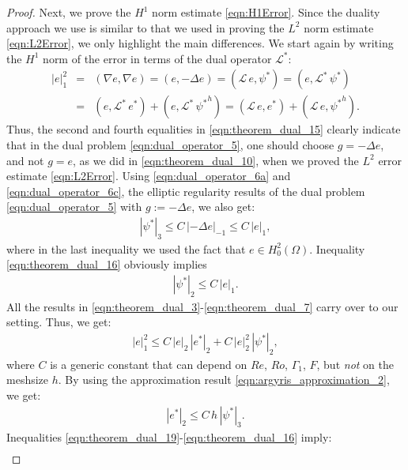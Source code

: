 \begin{proof}
Next, we prove the $H^1$ norm estimate \eqref{eqn:H1Error}.
Since the duality approach we use is similar to that we used in proving the  $L^2$ norm estimate \eqref{eqn:L2Error}, we only highlight the main differences.
We start again by writing the $H^1$ norm of the error in terms of the dual operator $\mathcal{L}^*$:
\begin{eqnarray}
|e|_1^2
&=& (\nabla e , \nabla e)
= ( e , - \Delta e)
= (\mathcal{L} \, e , \psi^*)
= (e , \mathcal{L}^* \, \psi^*)
\nonumber \\
&=& (e , \mathcal{L}^* \, e^*)
+ (e , \mathcal{L}^* \, {\psi^*}^h)
= (\mathcal{L} \, e , e^*)
+ (\mathcal{L} \, e , {\psi^*}^h) .
\label{eqn:theorem_dual_15}
\end{eqnarray}
Thus, the second and fourth equalities in \eqref{eqn:theorem_dual_15} clearly indicate that in the dual problem \eqref{eqn:dual_operator_5}, one should choose $g = - \Delta e$, and not $g = e$, as we did in \eqref{eqn:theorem_dual_10}, when we proved the $L^2$ error estimate \eqref{eqn:L2Error}.
Using \eqref{eqn:dual_operator_6a} and \eqref{eqn:dual_operator_6c}, the elliptic regularity results of the dual problem \eqref{eqn:dual_operator_5} with $g :=  - \Delta e$, we also get:
\begin{eqnarray}
| \psi^* |_3
\leq C \, | - \Delta e |_{-1}
\leq C \, | e |_1 ,
\label{eqn:theorem_dual_16}
\end{eqnarray}
where in the last inequality we used the fact that $e \in H_0^2(\Omega)$.
Inequality \eqref{eqn:theorem_dual_16} obviously implies
\begin{eqnarray}
| \psi^* |_2
\leq C \, | e |_1 .
\label{eqn:theorem_dual_17}
\end{eqnarray}
All the results in \eqref{eqn:theorem_dual_3}-\eqref{eqn:theorem_dual_7} carry over to our setting.
Thus, we get:
\begin{eqnarray}
|e|_1^2
\leq C \, | e |_2 \, |e^* |_2
+ C \, | e |_2^2 \, | \psi^* |_2 ,
\label{eqn:theorem_dual_18}
\end{eqnarray}
where $C$ is a generic constant that can depend on $Re$, $Ro$, $\Gamma_1$, $F$, but \emph{not} on the meshsize $h$.
By using the approximation result \eqref{eqn:argyris_approximation_2}, we get:
\begin{eqnarray}
|e^* |_2
\leq C \, h \, | \psi^* |_3 .
\label{eqn:theorem_dual_19}
\end{eqnarray}
Inequalities \eqref{eqn:theorem_dual_19}-\eqref{eqn:theorem_dual_16} imply:
\begin{eqnarray}

\end{eqnarray}
\end{proof}
